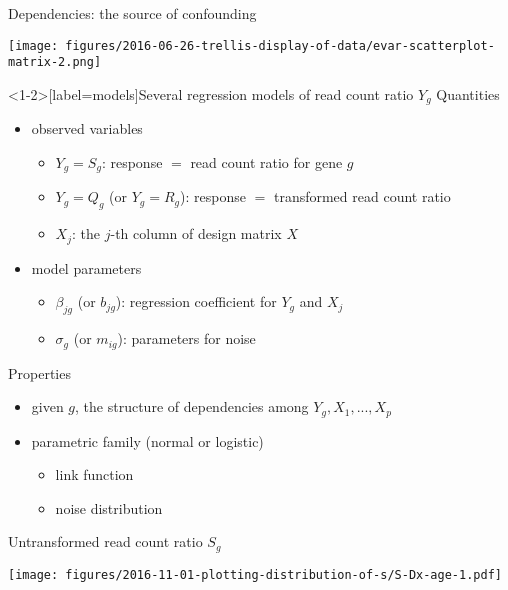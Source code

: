 \documentclass{beamer}
\begin{document}
\begin{frame}{Dependencies: the source of confounding}
\begin{center}
\texttt{[image: figures/2016-06-26-trellis-display-of-data/evar-scatterplot-matrix-2.png]}
\end{center}
\end{frame}

\begin{frame}<1-2>[label=models]{Several regression models of read count ratio \(Y_g\)}
Quantities
\begin{itemize}
\item<2-> observed variables
\begin{itemize}
\item<2-> \(Y_{g} = S_g\): response \(=\) read count ratio for gene \(g\)
\item<2-> \(Y_g = Q_{g}\) (or \(Y_g = R_g\)): response \(=\) transformed read count ratio
\item<3-> \(X_{j}\): the \(j\)-th column of design matrix \(X\)
\end{itemize}
\item<3-> model parameters
\begin{itemize}
\item<3-> \(\beta_{jg}\) (or \(b_{jg}\)): regression coefficient for \(Y_g\) and \(X_{j}\)
\item<3-> \(\sigma_g\) (or \(m_{ig}\)): parameters for noise 
\end{itemize}
\end{itemize}
\vfill
Properties
\begin{itemize}
\item<4-> given \(g\), the structure of dependencies among \(Y_g, X_1,...,X_p\)
\item<5-> parametric family (normal or logistic)
\begin{itemize}
\item<5-> link function
\item<5-> noise distribution 
\end{itemize}
\end{itemize} 
\end{frame}

\begin{frame}[label=untransformed]{Untransformed read count ratio \(S_g\)}
\begin{center}
\texttt{[image: figures/2016-11-01-plotting-distribution-of-s/S-Dx-age-1.pdf]}
\end{center}
\end{frame}
\end{document}
